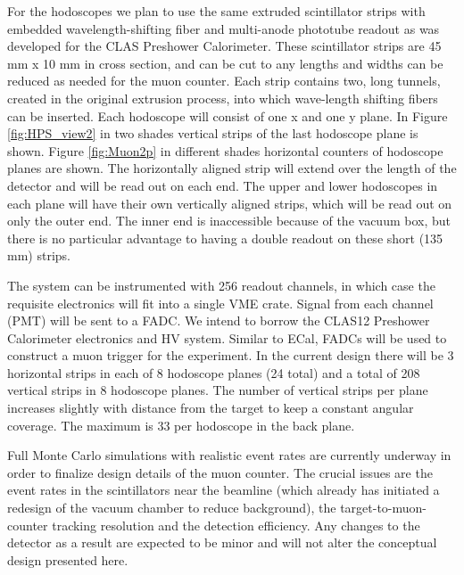 For the hodoscopes we plan to use the same extruded scintillator strips with embedded wavelength-shifting fiber and multi-anode phototube readout as was developed for the CLAS Preshower Calorimeter. These scintillator strips are 45 mm x 10 mm in cross section, and can be cut to any lengths and widths can be reduced as needed for the muon counter.  Each strip contains two, long tunnels, created in the original extrusion process, into which wave-length shifting fibers can be inserted.  Each hodoscope will consist of one x and one y plane.  In Figure \ref{fig:HPS_view2} in two shades vertical strips of the last hodoscope plane is shown. Figure \ref{fig:Muon2p} in different shades horizontal counters of hodoscope planes are shown. The horizontally aligned strip will extend over the length of the detector and will be read out on each end.  The upper and lower hodoscopes in each plane will have their own vertically aligned strips, which will be read out on only the outer end.  The inner end is inaccessible because of the vacuum box, but there is no particular advantage to having a double readout on these short (135 mm) strips.  

The system can be instrumented with 256 readout channels, in which case the requisite electronics will 
fit into a single VME crate.  Signal from each channel (PMT) 
will be sent to a FADC.  We intend to borrow the CLAS12 Preshower Calorimeter electronics and HV system.  Similar to ECal, FADCs will be used to construct a muon trigger for the experiment.  In the current design there will be 3 horizontal strips in each of 8 hodoscope planes (24 total) and a total of 208 vertical strips in 8 hodoscope planes.  The number of vertical strips per plane increases slightly with distance from the target to keep a constant angular coverage.  The maximum is 33 per hodoscope in the back plane.

Full Monte Carlo simulations with realistic event rates are currently underway in order to finalize design details of the muon counter.  The crucial issues are the event rates in the scintillators near the beamline (which already has initiated a redesign of the vacuum chamber to reduce background), the target-to-muon-counter tracking resolution and the detection efficiency.  Any changes to the detector as a result are expected to be minor and will not alter the conceptual design presented here.

